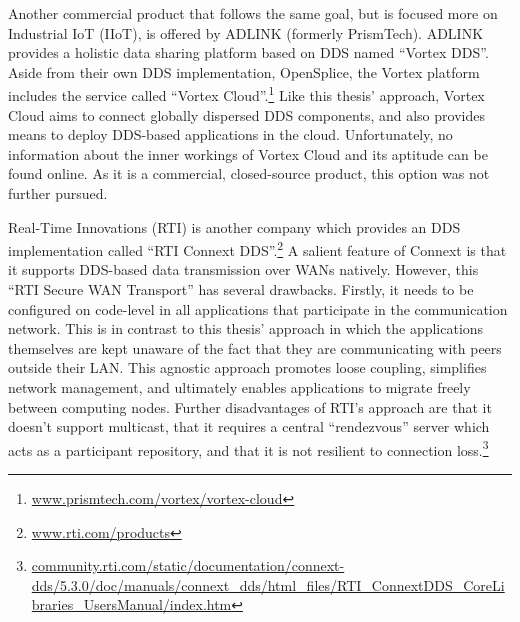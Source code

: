 Another commercial product that follows the same goal, but is focused more on Industrial IoT (IIoT), is offered by ADLINK (formerly PrismTech). ADLINK provides a holistic data sharing platform based on DDS named ``Vortex DDS''. Aside from their own DDS implementation, OpenSplice, the Vortex platform includes the service called ``Vortex Cloud''.\footnote{\url{www.prismtech.com/vortex/vortex-cloud}} Like this thesis' approach, Vortex Cloud aims to connect globally dispersed DDS components, and also provides means to deploy DDS-based applications in the cloud. Unfortunately, no information about the inner workings of Vortex Cloud and its aptitude can be found online. As it is a commercial, closed-source product, this option was not further pursued.

Real-Time Innovations (RTI) is another company which provides an DDS implementation called ``RTI Connext DDS''.\footnote{\url{www.rti.com/products}} A salient feature of Connext is that it supports DDS-based data transmission over WANs natively. However, this ``RTI Secure WAN Transport'' has several drawbacks. Firstly, it needs to be configured on code-level in all applications that participate in the communication network. This is in contrast to this thesis' approach in which the applications themselves are kept unaware of the fact that they are communicating with peers outside their LAN. This agnostic approach promotes loose coupling, simplifies network management, and ultimately enables applications to migrate freely between computing nodes. Further disadvantages of RTI's approach are that it doesn't support multicast, that it requires a central ``rendezvous'' server which acts as a participant repository, and that it is not resilient to connection loss.\footnote{\url{community.rti.com/static/documentation/connext-dds/5.3.0/doc/manuals/connext_dds/html_files/RTI_ConnextDDS_CoreLibraries_UsersManual/index.htm}}



